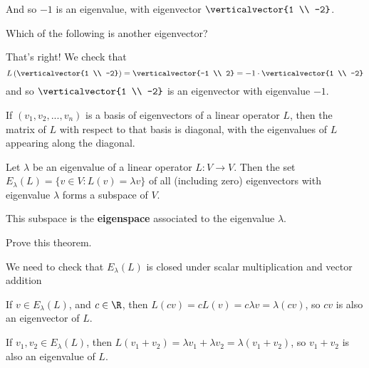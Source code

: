 \documentclass{ximera}
\begin{document}
\begin{question}
\begin{solution}
\begin{hint}
\begin{question}
        And so $-1$ is an eigenvalue, with eigenvector $\verticalvector{1 \\ -2}$.
      \end{question}
    \end{hint}

    Which of the following is another eigenvector?
    \begin{multiple-choice}
    \end{multiple-choice}
  \end{solution}

  That's right!  We check that 
  $$
  L\left( \verticalvector{1 \\ -2} \right) = \verticalvector{-1 \\ 2} = -1 \cdot \verticalvector{1 \\ -2}
  $$
  and so $\verticalvector{1 \\ -2}$ is an eigenvector with eigenvalue $-1$.


\end{question}

\begin{observation}
  If $(v_1,v_2,...,v_n)$ is a basis of eigenvectors of a linear
  operator $L$, then the matrix of $L$ with respect to that basis is
  diagonal, with the eigenvalues of $L$ appearing along the diagonal.
\end{observation}

\begin{theorem}
  Let $\lambda$ be an eigenvalue of a linear operator $L:V\to V$.
  Then the set $E_\lambda(L) = \{ v \in V: L(v) = \lambda v\}$ of all
  (including zero) eigenvectors with eigenvalue $\lambda$ forms a
  subspace of $V$.

  This subspace is the \textbf{eigenspace} associated to the
  eigenvalue $\lambda$.
\end{theorem}

Prove this theorem.
\begin{free-response}
	We need to check that $E_\lambda(L)$ is closed under scalar multiplication and vector addition
	
	If $v \in E_\lambda(L)$, and $c \in \R$, then $L(cv) = cL(v) = c\lambda v = \lambda( cv)$, so $cv$ is also an eigenvector of $L$.
	
	If $v_1,v_2 \in E_\lambda(L)$, then $L(v_1+v_2) = \lambda v_1+\lambda v_2 = \lambda( v_1 + v_2)$, so $v_1+v_2$ is also an eigenvalue of $L$.
\end{free-response}
\end{document}
